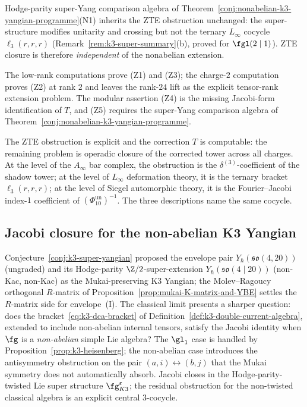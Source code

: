 \begin{conjecture}
\begin{enumerate}[label=\textup{(Z\arabic*)}]
 Hodge-parity super-Yang comparison algebra of
 Theorem~\ref{conj:nonabelian-k3-yangian-programme}\textup{(N1)}
 inherits the ZTE obstruction unchanged: the super-structure modifies
 unitarity and crossing but not the ternary $L_\infty$ cocycle
 $\ell_3(r, r, r)$ (Remark~\ref{rem:k3-super-summary}(b), proved
 for $\fgl(2 \mid 1)$). ZTE closure is therefore \emph{independent}
 of the nonabelian extension.
\end{enumerate}
The low-rank computations prove (Z1) and (Z3); the charge-$2$ computation
proves (Z2) at rank $2$ and leaves the rank-$24$ lift as the explicit
tensor-rank extension problem. The modular assertion (Z4) is the missing
Jacobi-form identification of $T$, and (Z5) requires the super-Yang
comparison algebra of Theorem~\ref{conj:nonabelian-k3-yangian-programme}.
\end{conjecture}

\begin{remark}
\label{rem:zte-frontier-entry}
The ZTE obstruction is explicit and the correction $T$ is computable:
the remaining problem is operadic closure of the corrected tower across
all charges. At the level of the $A_\infty$ bar complex, the obstruction
is the $\delta^{(3)}$-coefficient of the shadow tower; at the level of
$L_\infty$ deformation theory, it is the ternary bracket
$\ell_3(r, r, r)$; at the level of Siegel automorphic theory, it is the
Fourier--Jacobi index-$1$ coefficient of
\((\Phi_{10}^{\mathrm{un}})^{-1}\). The three descriptions name the
same cocycle.
\end{remark}

\subsection{Jacobi closure for the non-abelian K3 Yangian}
\label{subsec:k3yang-jacobi-closure}

Conjecture~\ref{conj:k3-super-yangian} proposed the envelope pair
$Y_\hbar(\mathfrak{so}(4, 20))$ (ungraded) and its Hodge-parity
$\Z/2$-super-extension $Y_\hbar(\mathfrak{so}(4 \mid 20))$ (non-Kac,
non-Kac) as the Mukai-preserving K$3$ Yangian; the Molev--Ragoucy
orthogonal $R$-matrix of Proposition~\ref{prop:mukai-K-matrix-and-YBE}
settles the $R$-matrix side for envelope~(I). The classical limit
presents a sharper question: does the bracket~\eqref{eq:k3-dca-bracket} of
Definition~\ref{def:k3-double-current-algebra},
extended to include non-abelian internal tensors, satisfy the Jacobi
identity when $\fg$ is a \emph{non-abelian} simple Lie algebra? The
$\gl_1$ case is handled by Proposition~\ref{prop:k3-heisenberg}; the
non-abelian case introduces the antisymmetry obstruction on the pair
$(a, i) \leftrightarrow (b, j)$ that the Mukai symmetry does not
automatically absorb. Jacobi closes in the Hodge-parity-twisted
Lie super structure $\fg^{\varepsilon}_{K3}$; the residual
obstruction for the non-twisted classical algebra is an explicit
central $3$-cocycle.

